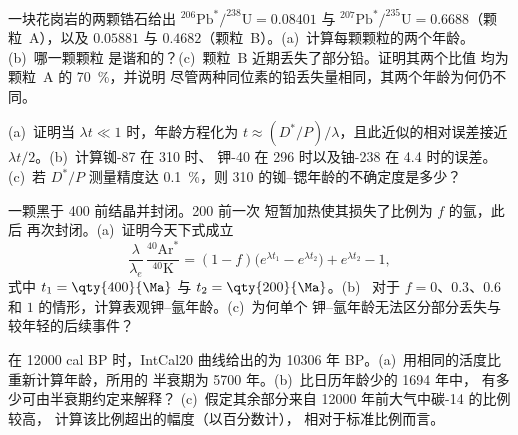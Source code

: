 \begin{exercise}[$\star\star$]\label{exo:b1:radiometric-methods:9}
一块花岗岩的两颗锆石给出
$^{206}\mathrm{Pb}^*/^{238}\mathrm{U} = 0.08401$ 与
$^{207}\mathrm{Pb}^*/^{235}\mathrm{U} = 0.6688$（颗粒~A），以及 $0.05881$ 与
$0.4682$（颗粒~B）。(a)~计算每颗颗粒的两个年龄。(b)~哪一颗颗粒
是谐和的？(c)~颗粒~B 近期丢失了部分铅。证明其两个比值
均为颗粒~A 的 \qty{70}{\percent}，并说明
尽管两种同位素的铅丢失量相同，其两个年龄为何仍不同。
\end{exercise}

\begin{exercise}[$\star\star\star$]\label{exo:b1:radiometric-methods:10}
(a)~证明当 $\lambda t \ll 1$ 时，年龄方程化为 $t \approx
(D^*/P)/\lambda$，且此近似的相对误差接近
$\lambda t/2$。(b)~计算铷-87 在 \qty{310}{\Ma} 时、
钾-40 在 \qty{296}{\Ma} 时以及铀-238 在 \qty{4.4}{\Ga} 时的误差。(c)~若
$D^*/P$ 测量精度达 \qty{0.1}{\percent}，则
\qty{310}{\Ma} 的铷–锶年龄的不确定度是多少？
\end{exercise}

\begin{exercise}[$\star\star\star$]\label{exo:b1:radiometric-methods:11}
一颗黑于 \qty{400}{\Ma} 前结晶并封闭。\qty{200}{\Ma} 前一次
短暂加热使其损失了比例为 $f$ 的氩，此后
再次封闭。(a)~证明今天下式成立
\[
  \frac{\lambda}{\lambda_e}\,\frac{^{40}\mathrm{Ar}^*}{^{40}\mathrm{K}} =
  (1 - f)\bigl(e^{\lambda t_1} - e^{\lambda t_2}\bigr) + e^{\lambda t_2} - 1,
\]
式中 $t_1 = \qty{400}{\Ma}$ 与 $t_2 = \qty{200}{\Ma}$。(b)~
对于 $f = 0$、$0.3$、$0.6$ 和 $1$ 的情形，计算表观钾–氩年龄。(c)~为何单个
钾–氩年龄无法区分部分丢失与较年轻的后续事件？
\end{exercise}

\begin{exercise}[$\star\star\star$]\label{exo:b1:radiometric-methods:12}
在 \num{12000} cal BP 时，IntCal20 曲线给出的为
\num{10306} 年 BP。(a)~用相同的活度比重新计算年龄，所用的
半衰期为 \num{5700} 年。(b)~比日历年龄少的 \num{1694} 年中，
有多少可由半衰期约定来解释？
(c)~假定其余部分来自 \num{12000} 年前大气中碳-14 的比例较高，
计算该比例超出的幅度（以百分数计），
相对于标准比例而言。
\end{exercise}

